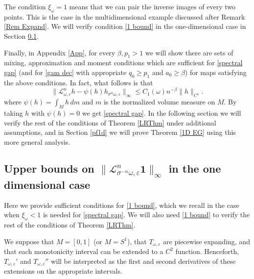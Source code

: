 \documentclass[11pt,reqno,a4paper]{article}
\theoremstyle{special}
\renewcommand{\epsilon}{\varepsilon}
\renewcommand{\L}{\mathcal{L}}
\def\om{\omega}
\begin{document}

  The condition $\xi_\omega=1$ means that we can pair the inverse images of every two points. This is the case in the multidimensional example discussed after Remark \ref{Rem Expand}.
We will verify condition \eqref{1 bound} in the one-dimensional case in Section \ref{Sec 3.2}. 


Finally, in Appendix \ref{App}, for every $\beta,p_1>1$ we will show 
there are sets of mixing, approximation and moment conditions  which are sufficient for  \eqref{spectral gap} (and for \eqref{gam dec} with appropriate $q_0\geq p_1$ and $a_0\geq \beta$) for maps satisfying the above conditions. 
In fact, what follows is that 
\begin{equation}\label{spectral gap1}
\|\L_{\omega, \epsilon}^n h-\psi(h)h_{\sigma^n\om, \epsilon}\|_\infty \le C_1(\omega)n^{-\beta}\|h \|_{C^1}.
\end{equation}
where $\psi(h)=\int_M h \, d m$ and $m$ is the normalized volume measure on $M$.
By taking $h$ with $\psi(h)=0$ we get \eqref{spectral gap}. 
In the following section we will verify the rest of the conditions of Theorem \ref{LRThm} under additional assumptions, and in Section \ref{pf1d} we will prove Theorem \ref{1D EG} using this more general analysis. 

 

\subsection{Upper bounds on $\|\mathcal L_{\sigma^{-n}\omega, \varepsilon}^n\textbf{1}\|_\infty$ in the one dimensional case}\label{Sec 3.2}
Here we provide sufficient conditions for \eqref{1 bound}, which we recall in the case when $\xi_\om<1$ is needed for \eqref{spectral gap}. We will also need \eqref{1 bound} to verify the rest of the conditions of Theorem \ref{LRThm}.

We suppose that $M=[0,1]$ (or $M=S^1$), that $T_{\om, \varepsilon}$ are piecewise expanding, and that each monotonicity interval  can be extended to a $C^2$ function. Henceforth, $T_{\om, \varepsilon}'$ and $T_{\om, \varepsilon}''$ will be interpreted as the first and second derivatives of these extensions on the appropriate intervals.
\end{document}
